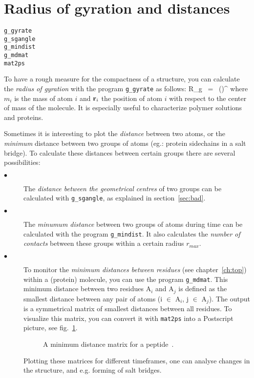 \section{Radius of gyration and distances}
\label{sec:rg}
\begin{verbatim}
g_gyrate
g_sgangle
g_mindist
g_mdmat
mat2ps
\end{verbatim}
To have a rough measure for the compactness of a structure, you can calculate 
the {\em radius of gyration} with the program {\tt g\_gyrate} as follows:
\beq
R_g ~=~ \left({}\right)^{\half}
\label{eq:rg}
\eeq
where $m_i$ is the mass of atom $i$ and ${\bf r}_i$ the position of 
atom $i$ with respect to the center of mass of the molecule. It is especially 
useful to characterize polymer solutions and proteins.

Sometimes it is interesting to plot the {\em distance} between two atoms,
or the {\em minimum} distance between two groups of atoms
(eg.: protein sidechains in a salt bridge). 
To calculate these distances between certain groups there are several 
possibilities:
\begin{description}
\item[$\bullet$] 
The {\em distance between the geometrical centres} of two groups can be 
calculated with {\tt g\_sgangle}, as explained in section~\ref{sec:bad}. 
\item[$\bullet$] 
The {\em minumum distance} between two groups of atoms during time 
can be calculated with the program {\tt g\_mindist}. It also calculates the 
{\em number of contacts} between these groups 
within a certain radius $r_{max}$.
\item[$\bullet$] 
To monitor the {\em minimum distances between residues} 
(see chapter~\ref{ch:top}) within a (protein) molecule, you can use 
the program {\tt g\_mdmat}. This minimum distance between two residues
A$_i$ and A$_j$ is defined as the smallest distance between any pair of 
atoms (i $\in$ A$_i$, j $\in$ A$_j$).
The output is a symmetrical matrix of smallest distances 
between all residues. To visualize this matrix, you can convert it with 
{\tt mat2ps} into a Postscript picture, see fig.~\ref{fig:mdmat}.
%
\begin{figure}
\centerline{
}
\caption{A minimum distance matrix for a peptide~\protect\cite{Spoel96b}.}
\label{fig:mdmat}
\end{figure}
%
Plotting these matrices for different timeframes, one can analyse changes 
in the structure, and e.g. forming of salt bridges.
\end{description}
%
%
